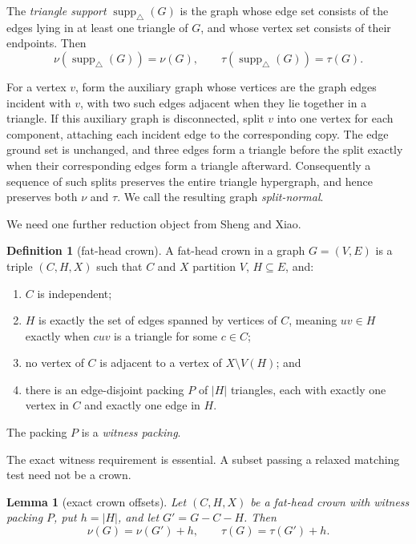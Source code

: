 \documentclass[11pt]{article}
\newtheorem{lemma}[theorem]{Lemma}
\theoremstyle{definition}
\newtheorem{definition}[theorem]{Definition}
\newcommand{\supp}{\operatorname{supp}_{\triangle}}
\begin{document}
The \emph{triangle support} $\supp(G)$ is the graph whose edge set consists
of the edges lying in at least one triangle of $G$, and whose vertex set
consists of their endpoints.  Then
\begin{equation}\label{eq:support}
  \nu(\supp(G))=\nu(G),\qquad
  \tau(\supp(G))=\tau(G).
\end{equation}

For a vertex $v$, form the auxiliary graph whose vertices are the graph edges
incident with $v$, with two such edges adjacent when they lie together in a
triangle.  If this auxiliary graph is disconnected, split $v$ into one vertex
for each component, attaching each incident edge to the corresponding copy.
The edge ground set is unchanged, and three edges form a triangle before the
split exactly when their corresponding edges form a triangle afterward.
Consequently a sequence of such splits preserves the entire triangle
hypergraph, and hence preserves both $\nu$ and $\tau$.  We call the resulting
graph \emph{split-normal}.

We need one further reduction object from Sheng and Xiao.

\begin{definition}[fat-head crown]\label{def:crown}
A fat-head crown in a graph $G=(V,E)$ is a triple $(C,H,X)$ such that $C$ and
$X$ partition $V$, $H\subseteq E$, and:
\begin{enumerate}[label=(\roman*)]
  \item $C$ is independent;
  \item $H$ is exactly the set of edges spanned by vertices of $C$, meaning
        $uv\in H$ exactly when $cuv$ is a triangle for some $c\in C$;
  \item no vertex of $C$ is adjacent to a vertex of $X\setminus V(H)$; and
  \item there is an edge-disjoint packing $P$ of $|H|$ triangles, each with
        exactly one vertex in $C$ and exactly one edge in $H$.
\end{enumerate}
The packing $P$ is a \emph{witness packing}.
\end{definition}

The exact witness requirement is essential.  A subset passing a relaxed
matching test need not be a crown.

\begin{lemma}[exact crown offsets]\label{lem:crown-offset}
Let $(C,H,X)$ be a fat-head crown with witness packing $P$, put $h=|H|$, and
let $G'=G-C-H$.  Then
\[
  \nu(G)=\nu(G')+h,
  \qquad
  \tau(G)=\tau(G')+h.
\]
\end{lemma}
\end{document}
